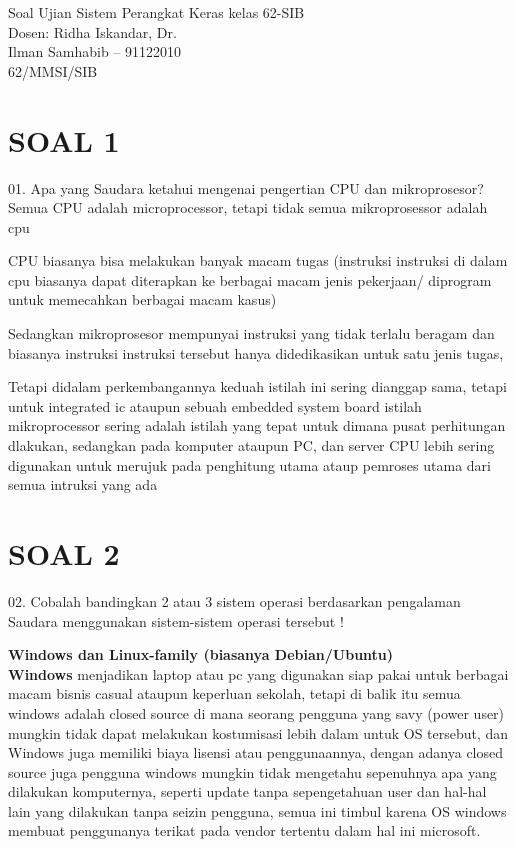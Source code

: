 \documentclass{article}
\begin{document}
\begin{center}
    Soal Ujian Sistem Perangkat Keras kelas 62-SIB\\
    Dosen: Ridha Iskandar, Dr.\\
    \smallbreak
    Ilman Samhabib -- 91122010\\
    62/MMSI/SIB  \\    
\end{center}


\section*{SOAL 1}
01. Apa yang Saudara ketahui mengenai pengertian CPU dan mikroprosesor?\\
\smallbreak
Semua CPU adalah microprocessor, tetapi tidak semua mikroprosessor adalah cpu

CPU biasanya bisa melakukan banyak macam tugas (instruksi instruksi di dalam cpu biasanya dapat diterapkan ke berbagai macam jenis pekerjaan/ diprogram untuk memecahkan berbagai macam kasus)

Sedangkan mikroprosesor mempunyai instruksi yang tidak terlalu beragam dan biasanya instruksi instruksi tersebut hanya didedikasikan untuk satu jenis tugas,

Tetapi didalam perkembangannya keduah istilah ini sering dianggap sama, tetapi untuk integrated ic ataupun sebuah embedded system board istilah mikroprocessor sering adalah istilah yang tepat untuk dimana pusat perhitungan dlakukan, sedangkan pada komputer ataupun PC, dan server CPU lebih sering digunakan untuk merujuk pada penghitung utama ataup pemroses utama dari semua intruksi yang ada



\section*{SOAL 2}
02.	Cobalah bandingkan 2 atau 3 sistem operasi berdasarkan pengalaman Saudara menggunakan
sistem-sistem operasi tersebut !\\
\smallbreak

\textbf{Windows dan Linux-family (biasanya Debian/Ubuntu)}\\
\textbf{Windows} menjadikan laptop atau pc yang digunakan siap pakai untuk berbagai macam bisnis casual ataupun keperluan sekolah, tetapi di balik itu semua windows adalah closed source di mana seorang pengguna yang savy (power user) mungkin tidak dapat melakukan kostumisasi lebih dalam untuk OS tersebut, dan Windows juga memiliki biaya lisensi atau penggunaannya, dengan adanya closed source juga pengguna windows mungkin tidak mengetahu sepenuhnya apa yang dilakukan komputernya, seperti update tanpa sepengetahuan user dan hal-hal lain yang dilakukan tanpa seizin pengguna, semua ini timbul karena OS windows membuat penggunanya terikat pada vendor tertentu dalam hal ini microsoft.
\end{document}

